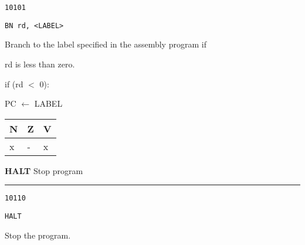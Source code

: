 \documentclass{article}
\begin{document}
{\large
	 \texttt{10101} \par
	\smallbreak
	 \texttt{BN rd, <LABEL>} \par
	\smallbreak
	 Branch to the label specified in the assembly program if  \par
	\makebox[3.5cm][l]{  } rd is less than zero. \par
	\smallbreak
	 if (rd $<$ 0): \par
	\makebox[4cm][l]{  } PC $\leftarrow$ LABEL \par
	\medbreak\medbreak
	 \begin{tabular}{lll} N \quad & Z \quad & V \\ \hline x & - & x \\ \end{tabular}
}

\flushleft
\LARGE\textbf{HALT} \large \hfill Stop program

\kern-3pt
\noindent\rule{16.5cm}{0.4pt}
\normalsize

{\large
	 \texttt{10110} \par
	\smallbreak
	 \texttt{HALT} \par
	\smallbreak
	 Stop the program. \par
}
\end{document}
